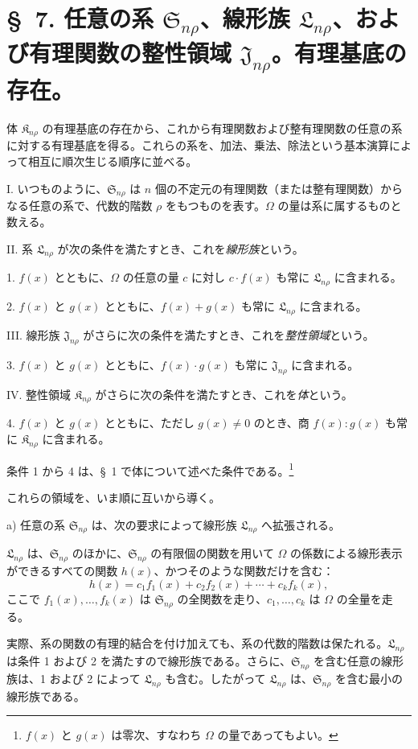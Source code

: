 \documentclass[11pt]{jlreq}
\providecommand{\Kfield}{\mathfrak{K}}
\providecommand{\Ssys}{\mathfrak{S}}
\providecommand{\Lsys}{\mathfrak{L}}
\providecommand{\Jdom}{\mathfrak{J}}
\begin{document}
\section*{\S\ 7. 任意の系 $\Ssys_{n\rho}$、線形族 $\Lsys_{n\rho}$、および有理関数の整性領域 $\Jdom_{n\rho}$。有理基底の存在。}

体 $\Kfield_{n\rho}$ の有理基底の存在から、これから有理関数および整有理関数の任意の系に対する有理基底を得る。これらの系を、加法、乗法、除法という基本演算によって相互に順次生じる順序に並べる。

I. いつものように、$\Ssys_{n\rho}$ は $n$ 個の不定元の有理関数（または整有理関数）からなる任意の系で、代数的階数 $\rho$ をもつものを表す。$\Omega$ の量は系に属するものと数える。

II. 系 $\Lsys_{n\rho}$ が次の条件を満たすとき、これを\emph{線形族}という。

1. $f(x)$ とともに、$\Omega$ の任意の量 $c$ に対し $c\cdot f(x)$ も常に $\Lsys_{n\rho}$ に含まれる。

2. $f(x)$ と $g(x)$ とともに、$f(x)+g(x)$ も常に $\Lsys_{n\rho}$ に含まれる。

III. 線形族 $\Jdom_{n\rho}$ がさらに次の条件を満たすとき、これを\emph{整性領域}という。

3. $f(x)$ と $g(x)$ とともに、$f(x)\cdot g(x)$ も常に $\Jdom_{n\rho}$ に含まれる。

IV. 整性領域 $\Kfield_{n\rho}$ がさらに次の条件を満たすとき、これを\emph{体}という。

4. $f(x)$ と $g(x)$ とともに、ただし $g(x)\ne0$ のとき、商 $f(x):g(x)$ も常に $\Kfield_{n\rho}$ に含まれる。

条件 1 から 4 は、\S\ 1 で体について述べた条件である。\footnote{$f(x)$ と $g(x)$ は零次、すなわち $\Omega$ の量であってもよい。}

これらの領域を、いま順に互いから導く。

a) 任意の系 $\Ssys_{n\rho}$ は、次の要求によって線形族 $\Lsys_{n\rho}$ へ拡張される。

$\Lsys_{n\rho}$ は、$\Ssys_{n\rho}$ のほかに、$\Ssys_{n\rho}$ の有限個の関数を用いて $\Omega$ の係数による線形表示ができるすべての関数 $h(x)$、かつそのような関数だけを含む：
\[
  h(x)=c_1f_1(x)+c_2f_2(x)+\cdots+c_kf_k(x),
\]
ここで $f_1(x),\ldots,f_k(x)$ は $\Ssys_{n\rho}$ の全関数を走り、$c_1,\ldots,c_k$ は $\Omega$ の全量を走る。

実際、系の関数の有理的結合を付け加えても、系の代数的階数は保たれる。$\Lsys_{n\rho}$ は条件 1 および 2 を満たすので線形族である。さらに、$\Ssys_{n\rho}$ を含む任意の線形族は、1 および 2 によって $\Lsys_{n\rho}$ も含む。したがって $\Lsys_{n\rho}$ は、$\Ssys_{n\rho}$ を含む最小の線形族である。
\end{document}
